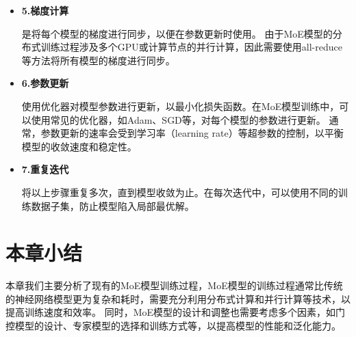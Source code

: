\begin{itemize}
    \item \textbf{5.梯度计算}
    
    是将每个模型的梯度进行同步，以便在参数更新时使用。
    由于MoE模型的分布式训练过程涉及多个GPU或计算节点的并行计算，因此需要使用all-reduce等方法将所有模型的梯度进行同步。

    \item \textbf{6.参数更新}
    
    使用优化器对模型参数进行更新，以最小化损失函数。在MoE模型训练中，可以使用常见的优化器，如Adam、SGD等，对每个模型的参数进行更新。
    通常，参数更新的速率会受到学习率（learning rate）等超参数的控制，以平衡模型的收敛速度和稳定性。

    \item \textbf{7.重复迭代}
    
    将以上步骤重复多次，直到模型收敛为止。在每次迭代中，可以使用不同的训练数据子集，防止模型陷入局部最优解。

\end{itemize}

\section{本章小结}

本章我们主要分析了现有的MoE模型训练过程，MoE模型的训练过程通常比传统的神经网络模型更为复杂和耗时，需要充分利用分布式计算和并行计算等技术，以提高训练速度和效率。
% 
同时，MoE模型的设计和调整也需要考虑多个因素，如门控模型的设计、专家模型的选择和训练方式等，以提高模型的性能和泛化能力。

\endinput